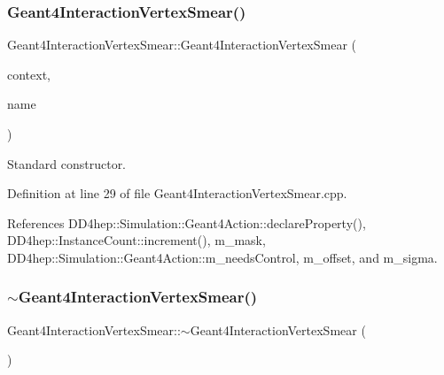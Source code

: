 \subsubsection{\texorpdfstring{Geant4\+Interaction\+Vertex\+Smear()}{Geant4InteractionVertexSmear()}}
{\footnotesize\ttfamily Geant4\+Interaction\+Vertex\+Smear\+::\+Geant4\+Interaction\+Vertex\+Smear (\begin{DoxyParamCaption}\item[{\hyperlink{class_d_d4hep_1_1_simulation_1_1_geant4_context}{Geant4\+Context} $\ast$}]{context,  }\item[{const std\+::string \&}]{name }\end{DoxyParamCaption})}



Standard constructor. 



Definition at line 29 of file Geant4\+Interaction\+Vertex\+Smear.\+cpp.



References D\+D4hep\+::\+Simulation\+::\+Geant4\+Action\+::declare\+Property(), D\+D4hep\+::\+Instance\+Count\+::increment(), m\+\_\+mask, D\+D4hep\+::\+Simulation\+::\+Geant4\+Action\+::m\+\_\+needs\+Control, m\+\_\+offset, and m\+\_\+sigma.

\hypertarget{class_d_d4hep_1_1_simulation_1_1_geant4_interaction_vertex_smear_aca69c6fbcb40dc0bcb6cd044906e5028}{}\label{class_d_d4hep_1_1_simulation_1_1_geant4_interaction_vertex_smear_aca69c6fbcb40dc0bcb6cd044906e5028} 
\subsubsection{\texorpdfstring{$\sim$\+Geant4\+Interaction\+Vertex\+Smear()}{~Geant4InteractionVertexSmear()}}
{\footnotesize\ttfamily Geant4\+Interaction\+Vertex\+Smear\+::$\sim$\+Geant4\+Interaction\+Vertex\+Smear (\begin{DoxyParamCaption}{ }\end{DoxyParamCaption})\hspace{0.3cm}{\ttfamily [virtual]}}



